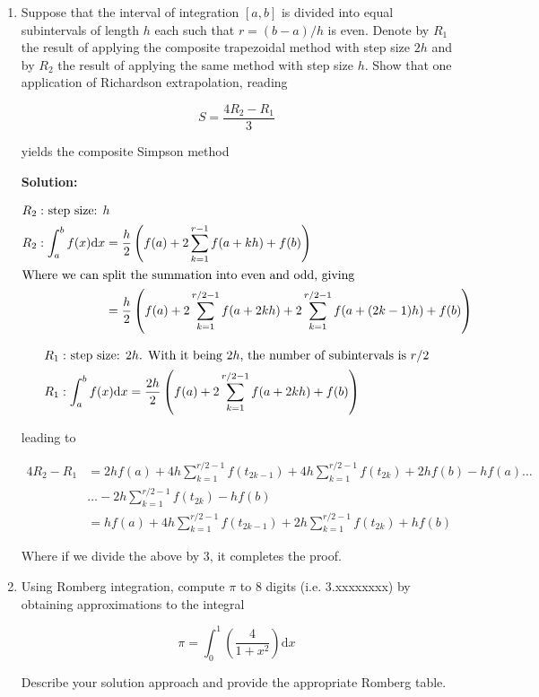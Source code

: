 \documentclass[12pt]{article}
\begin{document}
\begin{enumerate}
\item Suppose that the interval of integration $[a, b]$ is divided into equal subintervals of length $h$ each such that $r = (b - a)/h$ is even. Denote by $R_{1}$ the result of applying the composite trapezoidal method with step size $2h$ and by $R_{2}$ the result of applying the same method with step size $h$. Show that one application of Richardson extrapolation, reading 

\[
S = \frac{4R_{2} - R_{1}}{3}
\]

yields the composite Simpson method

{\bf Solution:}

\begin{align*}
\intertext{$R_{2}:$ step size: $h$}
R_{2} : \int_{a}^{b}f(x)\text{d}x &= \frac{h}{2}\left( f(a) + 2\sum_{k=1}^{r-1} f(a + kh) + f(b)\right)\\
\intertext{Where we can split the summation into even and odd, giving}
&= \frac{h}{2}\left( f(a) + 2\sum_{k=1}^{r/2 - 1} f(a + 2kh) + 2\sum_{k=1}^{r/2-1}f(a + (2k - 1)h) + f(b) \right)
\end{align*}

\begin{align*}
\intertext{$R_{1}:$ step size: $2h$. With it being $2h$, the number of subintervals is $r/2$}
R_{1}: \int_{a}^{b}f(x)\text{d}x &= \frac{2h}{2}\left( f(a) + 2\sum_{k=1}^{r/2-1} f(a + 2kh) + f(b) \right)\\
\end{align*}

leading to

\begin{align*}
4R_{2} - R_{1} &= 2hf(a) + 4h\sum_{k=1}^{r/2-1} f(t_{2k-1}) + 4h\sum_{k=1}^{r/2-1}f(t_{2k}) + 2hf(b) - hf(a)\ldots \\
                          &\ldots - 2h\sum_{k=1}^{r/2-1}f(t_{2k}) - hf(b)\\
                          &= hf(a) + 4h\sum_{k=1}^{r/2-1}f(t_{2k-1}) + 2h\sum_{k=1}^{r/2-1} f(t_{2k}) + hf(b)
\end{align*}

Where if we divide the above by 3, it completes the proof.

\item Using Romberg integration, compute $\pi$ to 8 digits (i.e. 3.xxxxxxxx) by obtaining approximations to the integral

\[
\pi = \int_{0}^{1}\left( \frac{4}{1 + x^{2}}\right)\text{d}x
\]

Describe your solution approach and provide the appropriate Romberg table.


\end{enumerate}
\end{document}

